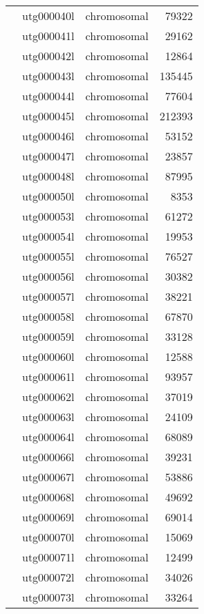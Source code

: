 {\begin{supertabular}{llcr}
         & utg000040l & chromosomal & 79322 \\
         & utg000041l & chromosomal & 29162 \\
         & utg000042l & chromosomal & 12864 \\
         & utg000043l & chromosomal & 135445 \\
         & utg000044l & chromosomal & 77604 \\
         & utg000045l & chromosomal & 212393 \\
         & utg000046l & chromosomal & 53152 \\
         & utg000047l & chromosomal & 23857 \\
         & utg000048l & chromosomal & 87995 \\
         & utg000050l & chromosomal & 8353 \\
         & utg000053l & chromosomal & 61272 \\
         & utg000054l & chromosomal & 19953 \\
         & utg000055l & chromosomal & 76527 \\
         & utg000056l & chromosomal & 30382 \\
         & utg000057l & chromosomal & 38221 \\
         & utg000058l & chromosomal & 67870 \\
         & utg000059l & chromosomal & 33128 \\
         & utg000060l & chromosomal & 12588 \\
         & utg000061l & chromosomal & 93957 \\
         & utg000062l & chromosomal & 37019 \\
         & utg000063l & chromosomal & 24109 \\
         & utg000064l & chromosomal & 68089 \\
         & utg000066l & chromosomal & 39231 \\
         & utg000067l & chromosomal & 53886 \\
         & utg000068l & chromosomal & 49692 \\
         & utg000069l & chromosomal & 69014 \\
         & utg000070l & chromosomal & 15069 \\
         & utg000071l & chromosomal & 12499 \\
         & utg000072l & chromosomal & 34026 \\
         & utg000073l & chromosomal & 33264 \\

\end{supertabular}}
